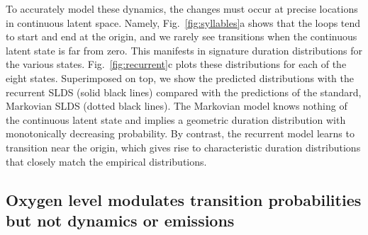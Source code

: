 \documentclass[11pt]{article}
\begin{document}
To accurately model these dynamics, the changes must occur at precise
locations in continuous latent space.  Namely,
Fig.~\ref{fig:syllables}a shows that the loops tend to start and end
at the origin, and we rarely see transitions when the continuous
latent state is far from zero. This manifests in signature duration
distributions for the various states.  Fig.~\ref{fig:recurrent}c plots
these distributions for each of the eight states.  Superimposed on
top, we show the predicted distributions with the recurrent SLDS
(solid black lines) compared with the predictions of the standard,
Markovian SLDS (dotted black lines). The Markovian model knows nothing
of the continuous latent state and implies a geometric duration
distribution with monotonically decreasing probability. By contrast,
the recurrent model learns to transition near the origin, which
gives rise to characteristic duration distributions that closely
match the empirical distributions. 


\subsection*{Oxygen level modulates transition probabilities but not dynamics or emissions}
\end{document}
